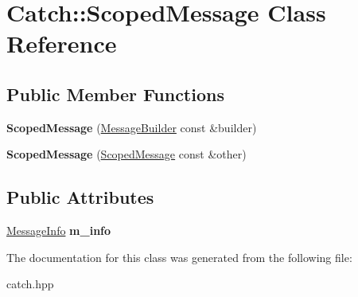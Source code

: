\hypertarget{classCatch_1_1ScopedMessage}{}\section{Catch\+:\+:Scoped\+Message Class Reference}
\label{classCatch_1_1ScopedMessage}
\subsection*{Public Member Functions}
\begin{DoxyCompactItemize}
\item 
\mbox{\label{classCatch_1_1ScopedMessage_a5cc59f0f2ebe840e6607f83004d49a17}} 
{\bfseries Scoped\+Message} (\hyperlink{structCatch_1_1MessageBuilder}{Message\+Builder} const \&builder)
\item 
\mbox{\label{classCatch_1_1ScopedMessage_ae03a17fd47220d563d4abc73e7518e29}} 
{\bfseries Scoped\+Message} (\hyperlink{classCatch_1_1ScopedMessage}{Scoped\+Message} const \&other)
\end{DoxyCompactItemize}
\subsection*{Public Attributes}
\begin{DoxyCompactItemize}
\item 
\mbox{\label{classCatch_1_1ScopedMessage_ae6e1476f389cc6e1586f033b3747b27b}} 
\hyperlink{structCatch_1_1MessageInfo}{Message\+Info} {\bfseries m\+\_\+info}
\end{DoxyCompactItemize}


The documentation for this class was generated from the following file\+:\begin{DoxyCompactItemize}
\item 
catch.\+hpp\end{DoxyCompactItemize}
